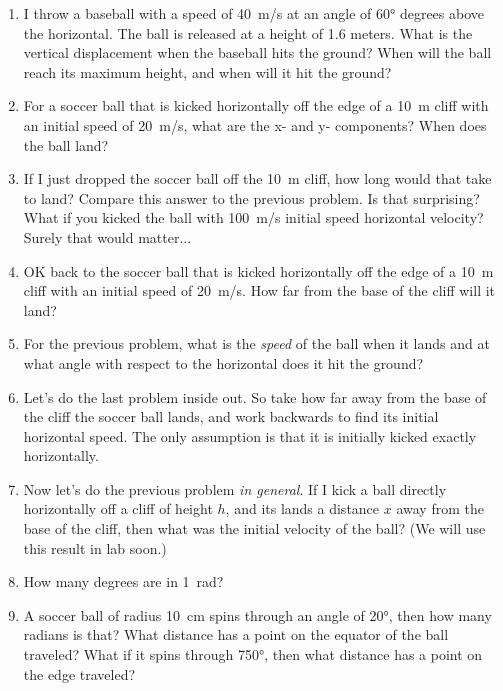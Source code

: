 \begin{enumerate}
	\item I throw a baseball with a speed of \SI{40}{m/s} at an angle of \ang{60} degrees above the horizontal. The ball is released at a height of 1.6 meters. What is the vertical displacement when the baseball hits the ground? When will the ball reach its maximum height, and when will it hit the ground? 
	
	\item For a soccer ball that is kicked horizontally off the edge of a \SI{10}{\meter} cliff with an initial speed of \SI{20}{m/s}, what are the x- and y- components? When does the ball land? \bigskip
	
	\item If I just dropped the soccer ball off the \SI{10}{\meter} cliff, how long would that take to land? Compare this answer to the previous problem. Is that surprising? What if you kicked the ball with \SI{100}{m/s} initial speed horizontal velocity? Surely that would matter...\bigskip 
	
	\item OK back to the soccer ball that is kicked horizontally off the edge of a \SI{10}{\meter} cliff with an initial speed of \SI{20}{m/s}. How far from the base of the cliff will it land?
	
	\item For the previous problem, what is the \emph{speed} of the ball when it lands and at what angle with respect to the horizontal does it hit the ground?
	
	\item Let's do the last problem inside out. So take how far away from the base of the cliff the soccer ball lands, and work backwards to find its initial horizontal speed. The only assumption is that it is initially kicked exactly horizontally.\bigskip
	
	\item
	Now let's do the previous problem \emph{in general}. If I kick a ball directly horizontally off a cliff of height $h$, and its lands a distance $x$ away from the base of the cliff, then what was the initial velocity of the ball? (We will use this result in lab soon.)
	
	\item How many degrees are in \SI{1}{\radian}?
	\item A soccer ball of radius \SI{10}{cm} spins through an angle of \ang{20}, then how many radians is that? What distance has a point on the equator of the ball traveled? What if it spins through \ang{750}, then what distance has a point on the edge traveled?
	

\end{enumerate}
